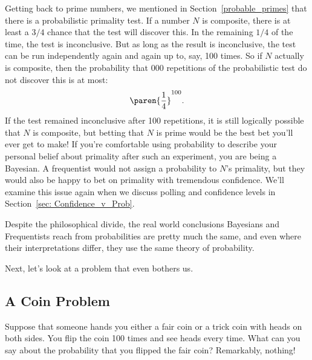 Getting back to prime numbers, we mentioned in
Section~\ref{probable_primes} that there is a probabilistic primality
test.  If a number $N$ is composite, there is at least a $3/4$ chance
that the test will discover this.  In the remaining $1/4$ of the time,
the test is inconclusive.  But as long as the result is inconclusive,
the test can be run independently again and again up to, say, 100
times.  So if $N$ actually is composite, then the probability that
$000$ repetitions of the probabilistic test do not discover this is
at most:
\[
\paren{\frac{1}{4}}^{100}.
\]
If the test remained inconclusive after 100 repetitions, it is still
logically possible that $N$ is composite, but betting that $N$ is
prime would be the best bet you'll ever get to make!  If you're
comfortable using probability to describe your personal belief about
primality after such an experiment, you are being a Bayesian.  A
frequentist would not assign a probability to $N$'s primality, but
they would also be happy to bet on primality with tremendous
confidence.  We'll examine this issue again when we discuss polling
and confidence levels in Section~\ref{sec: Confidence_v_Prob}.

Despite the philosophical divide, the real world conclusions Bayesians
and Frequentists reach from probabilities are pretty much the same,
and even where their interpretations differ, they use the same theory
of probability.

\iffalse

Next, let's look at a problem that even bothers us.

\subsection{A Coin Problem}

Suppose that someone hands you either a fair coin or a trick coin with
heads on both sides.  You flip the coin 100 times and see heads every
time.  What can you say about the probability that you flipped the
fair coin?  Remarkably, nothing!


